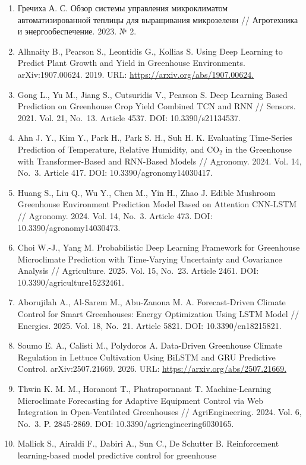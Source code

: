 \documentclass[a4paper,14pt]{extarticle}
\begin{document}
\begin{enumerate}
  университет, 2021.
\item
  Гречиха А. С. Обзор системы управления микроклиматом
  автоматизированной теплицы для выращивания микрозелени // Агротехника
  и энергообеспечение. 2023. № 2.
\item
  Alhnaity B., Pearson S., Leontidis G., Kollias S. Using Deep Learning
  to Predict Plant Growth and Yield in Greenhouse Environments.
  arXiv:1907.00624. 2019. URL: \url{https://arxiv.org/abs/1907.00624.}
\item
  Gong L., Yu M., Jiang S., Cutsuridis V., Pearson S. Deep Learning
  Based Prediction on Greenhouse Crop Yield Combined TCN and RNN //
  Sensors. 2021. Vol. 21, No.~13. Article 4537. DOI: 10.3390/s21134537.
\item
  Ahn J. Y., Kim Y., Park H., Park S. H., Suh H. K. Evaluating
  Time-Series Prediction of Temperature, Relative Humidity, and CO\(_2\)
  in the Greenhouse with Transformer-Based and RNN-Based Models //
  Agronomy. 2024. Vol. 14, No.~3. Article 417. DOI:
  10.3390/agronomy14030417.
\item
  Huang S., Liu Q., Wu Y., Chen M., Yin H., Zhao J. Edible Mushroom
  Greenhouse Environment Prediction Model Based on Attention CNN-LSTM //
  Agronomy. 2024. Vol. 14, No.~3. Article 473. DOI:
  10.3390/agronomy14030473.
\item
  Choi W.-J., Yang M. Probabilistic Deep Learning Framework for
  Greenhouse Microclimate Prediction with Time-Varying Uncertainty and
  Covariance Analysis // Agriculture. 2025. Vol. 15, No.~23. Article
  2461. DOI: 10.3390/agriculture15232461.
\item
  Aborujilah A., Al-Sarem M., Abu-Zanona M. A. Forecast-Driven Climate
  Control for Smart Greenhouses: Energy Optimization Using LSTM Model //
  Energies. 2025. Vol. 18, No.~21. Article 5821. DOI:
  10.3390/en18215821.
\item
  Soumo E. A., Calisti M., Polydoros A. Data-Driven Greenhouse Climate
  Regulation in Lettuce Cultivation Using BiLSTM and GRU Predictive
  Control. arXiv:2507.21669. 2026. URL:
  \url{https://arxiv.org/abs/2507.21669.}
\item
  Thwin K. M. M., Horanont T., Phatrapornnant T. Machine-Learning
  Microclimate Forecasting for Adaptive Equipment Control via Web
  Integration in Open-Ventilated Greenhouses // AgriEngineering. 2024.
  Vol. 6, No.~3. P. 2845-2869. DOI: 10.3390/agriengineering6030165.
\item
  Mallick S., Airaldi F., Dabiri A., Sun C., De Schutter B.
  Reinforcement learning-based model predictive control for greenhouse

\end{enumerate}
\end{document}
